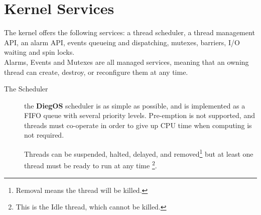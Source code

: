 \documentclass[11pt,b5paper]{scrbook}
\newcommand{\myOS}{{\color{SteelBlue}\textbf{DiegOS}}}
\begin{document}
\section{Kernel Services}
The kernel offers the following services: a thread scheduler, a thread management API, 
an alarm API, events queueing and dispatching, mutexes, barriers, I/O waiting and spin locks.\\
Alarms, Events and Mutexes are all managed services, meaning that an owning thread
can create, destroy, or reconfigure them at any time.

\begin{description}
\item[The Scheduler] the {\myOS} scheduler is as simple as possible, and is implemented as a FIFO
queue with several priority levels. Pre-emption is not supported, and threads must co-operate in
 order to give up CPU time when computing is not required.

Threads can be suspended, halted, delayed, and removed\footnote{Removal means the
thread will be killed.} but at least one thread must be ready to run at any time
\footnote{This is the Idle thread, which cannot be killed.}.


\begin{figure}
    \centering
{}
\end{figure}
\end{description}
\end{document}
